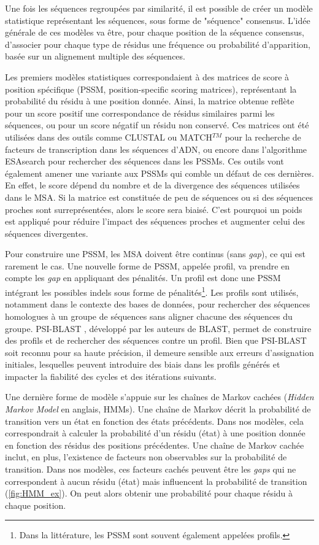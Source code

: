 Une fois les séquences regroupées par similarité, il est possible de créer un modèle statistique représentant les séquences, sous forme de "séquence" consensus. L'idée générale de ces modèles va être, pour chaque position de la séquence consensus, d'associer pour chaque type de résidus une fréquence ou probabilité d'apparition, basée sur un alignement multiple des séquences.

Les premiers modèles statistiques correspondaient à des matrices de score à position spécifique (PSSM, position-specific scoring matrices), représentant la probabilité du résidu à une position donnée. Ainsi, la matrice obtenue reflète pour un score positif une correspondance de résidus similaires parmi les séquences, ou pour un score négatif un résidu non conservé. Ces matrices ont été utilisées dans des outils comme CLUSTAL \cite{higgins_clustal_1988} ou MATCH$^{TM}$ \cite{kel_matchtm_2003} pour la recherche de facteurs de transcription dans les séquences d'ADN, ou encore dans l'algorithme ESAsearch \cite{beckstette_fast_2006} pour rechercher des séquences dans les PSSMs. Ces outils vont également amener une variante aux PSSMs qui comble un défaut de ces dernières. En effet, le score dépend du nombre et de la divergence des séquences utilisées dans le MSA. Si la matrice est constituée de peu de séquences ou si des séquences proches sont surreprésentées, alors le score sera biaisé. C'est pourquoi un poids est appliqué pour réduire l'impact des séquences proches et augmenter celui des séquences divergentes. 

Pour construire une PSSM, les MSA doivent être continus (sans \textit{gap}), ce qui est rarement le cas. Une nouvelle forme de PSSM, appelée profil, va prendre en compte les \textit{gap} en appliquant des pénalités. Un profil est donc une PSSM intégrant les possibles indels sous forme de pénalités\footnote{Dans la littérature, les PSSM sont souvent également appelées profils.}. Les profils sont utilisés, notamment dans le contexte des bases de données, pour rechercher des séquences homologues à un groupe de séquences sans aligner chacune des séquences du groupe. PSI-BLAST \cite{altschul_gapped_1997}, développé par les auteurs de BLAST, permet de construire des profils et de rechercher des séquences contre un profil. Bien que PSI-BLAST soit reconnu pour sa haute précision, il demeure sensible aux erreurs d'assignation initiales, lesquelles peuvent introduire des biais dans les profils générés et impacter la fiabilité des cycles et des itérations suivants.

Une dernière forme de modèle s'appuie sur les chaînes de Markov cachées (\textit{Hidden Markov Model} en anglais, HMMs). Une chaîne de Markov décrit la probabilité de transition vers un état en fonction des états précédents. Dans nos modèles, cela correspondrait à calculer la probabilité d'un résidu (état) à une position donnée en fonction des résidus des positions précédentes. Une chaîne de Markov cachée inclut, en plus, l'existence de facteurs non observables sur la probabilité de transition. Dans nos modèles, ces facteurs cachés peuvent être les \textit{gaps} qui ne correspondent à aucun résidu (état) mais influencent la probabilité de transition (\autoref{fig:HMM_ex}). On peut alors obtenir une probabilité pour chaque résidu à chaque position. 

